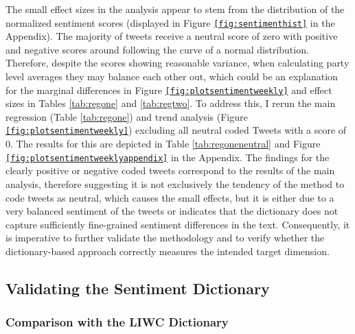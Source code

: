 \documentclass[a4paper,11pt]{article}
\begin{document}
The small effect sizes in the analysis appear to stem from the distribution of the normalized sentiment scores (displayed in Figure \texttt{\ref{fig:sentimenthist}} in the Appendix). The majority of tweets receive a neutral score of zero with positive and negative scores around following the curve of a normal distribution. Therefore, despite the scores showing reasonable variance, when calculating party level averages they may balance each other out, which could be an explanation for the marginal differences in Figure \texttt{\ref{fig:plotsentimentweekly}} and effect sizes in Tables \ref{tab:regone} and \ref{tab:regtwo}. To address this, I rerun the main regression (Table \ref{tab:regone}) and trend analysis (Figure \texttt{\ref{fig:plotsentimentweekly}}) excluding all neutral coded Tweets with a score of 0. The results for this are depicted in Table \ref{tab:regoneneutral} and Figure \texttt{\ref{fig:plotsentimentweeklyappendix}} in the Appendix. The findings for the clearly positive or negative coded tweets correspond to the results of the main analysis, therefore suggesting it is not exclusively the tendency of the method to code tweets as neutral, which causes the small effects, but it is either due to a very balanced sentiment of the tweets or indicates that the dictionary does not capture sufficiently fine-grained sentiment differences in the text. Consequently, it is imperative to further validate the methodology and to verify whether the dictionary-based approach correctly measures the intended target dimension.

\hypertarget{validating-the-sentiment-dictionary}{%
\subsection{Validating the Sentiment Dictionary}\label{validating-the-sentiment-dictionary}}

\hypertarget{comparison-with-the-liwc-dictionary}{%
\subsubsection{Comparison with the LIWC Dictionary}\label{comparison-with-the-liwc-dictionary}}
\end{document}
